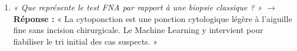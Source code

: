 \documentclass[10pt,a4paper]{article}
\begin{document}
\begin{tcolorbox}[memberbox, title={1. Abdellah LAASSRIA (Master M2SI) -- Slides 1, 2 et 3 (~2 min)}]
\begin{itemize}[leftmargin=0.5cm, itemsep=2pt]
\begin{enumerate}
		$\rightarrow$ \textbf{Réponse :} « Parce qu'une cohorte médicale a des coûts asymétriques. Prédire systématiquement "bénin" donnerait 62,7\,\% d'accuracy tout en manquant 100\,\% des tumeurs malignes. Notre boussole médicale est le Rappel malin. »
		\item \textit{« Que représente le test FNA par rapport à une biopsie classique ? »}  
		$\rightarrow$ \textbf{Réponse :} « La cytoponction est une ponction cytologique légère à l'aiguille fine sans incision chirurgicale. Le Machine Learning y intervient pour fiabiliser le tri initial des cas suspects. »
	\end{enumerate}
\end{itemize}
\end{tcolorbox}

\end{document}
